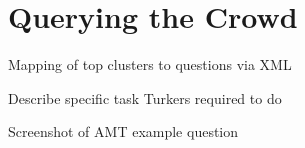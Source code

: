 \section{Querying the Crowd}






Mapping of top clusters to questions via XML \newline

\noindent Describe specific task Turkers required to do \newline

\noindent Screenshot of AMT example question





